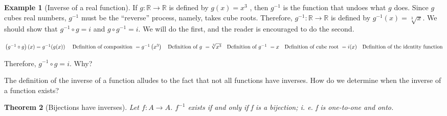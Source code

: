 \documentclass[10pt,]{book}
\theoremstyle{plain}
\newtheorem{theorem}{Theorem}[section]
\theoremstyle{definition}
\theoremstyle{definition}
\newtheorem{example}[theorem]{Example}
\theoremstyle{definition}
\begin{document}
\begin{example}[Inverse of a real function]\label{ex-inverse-of-a-real-function}
If \(g : \mathbb{R} \rightarrow  \mathbb{R}\) is defined by \(g(x) =x^3\) , then \(g^{-1}\) is the function that undoes what
\(g\) does. Since \(g\) cubes real numbers, \(g^{-1}\) must be the ``reverse'' process, namely, takes cube roots. Therefore, \(g^{-1}
: \mathbb{R} \rightarrow  \mathbb{R}\) is defined by \(g^{-1}(x)=\sqrt[3]{x}\). We should show that \(g^{-1}\circ g = i\) and \(g\circ g^{-1}=i\).
We will do the first, and the reader is encouraged to do the second.

\(\left(g^{-1}\circ g\right)(x)= g^{-1}(g(x)) \quad \textrm{ Definition of composition}\\
\\
\text{       }= g^{-1}\left(x^3\right)\quad \text{Definition of } g\\
\\
\text{                       }=\sqrt[3]{x^3}\quad\textrm{Definition of } g^{-1}\\
\\
\text{                      }= x\quad\text{Definition of cube root}\\
\\
\text{     }= i(x)\quad\text{Definition of the identity function}\)%
\par
Therefore, \(g^{-1}\circ g = i\). Why?
%
\end{example}
\par
The definition of the inverse of a function alludes to the fact that not all functions have inverses. How do we determine when the inverse of a function
exists?%
\begin{theorem}[Bijections have inverses]\label{theorem-bijections-have-inverses}
Let \(f: A\rightarrow  A\).  \(f^{-1}\) exists if and only if f is a bijection; i. e. f is one-to-one and onto.%
\end{theorem}
\end{document}
